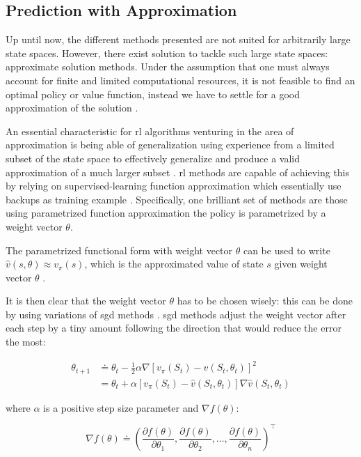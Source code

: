 \documentclass{seal_thesis}
\begin{document}
\subsection{ Prediction with Approximation}
\label{subsec:onpol_pred}

Up until now, the different methods presented are not suited for arbitrarily large state spaces. However, there exist solution to tackle such large state spaces: approximate solution methods. Under the assumption that one must always account for finite and limited computational resources, it is not feasible to find an optimal policy or value function, instead we have to settle for a good approximation of the solution \cite[p. 189]{Sutton2017}.

An essential characteristic for \gls{rl} algorithms venturing in the area of approximation is being able of generalization \ie using experience from a limited subset of the state space to effectively generalize and produce a valid approximation of a much larger subset  \cite[p. 189]{Sutton2017}. \gls{rl} methods are capable of achieving this by relying on supervised-learning function approximation which essentially use backups as training example \cite[p. 222]{Sutton2017}. Specifically, one brilliant set of methods are those using parametrized function approximation \ie the policy is parametrized by a weight vector $\theta$.

The parametrized functional form with weight vector $\theta$ can be used to write $\hat{v}(s,\theta) \approx v_\pi (s)$, which is the approximated value of state $s$ given weight vector $\theta$ \cite[p. 191]{Sutton2017}.

It is then clear that the weight vector $\theta$ has to be chosen wisely: this can be done by using variations of \gls{sgd} methods \cite[p. 223]{Sutton2017}. \gls{sgd} methods adjust the weight vector after each step by a tiny amount following the direction that would reduce the error the most:

\begin{align}
	\theta_{t+1} &\doteq \theta_t - \frac{1}{2} \alpha \nabla [v_\pi (S_t) - \hat{v} (S_t,\theta_t)]^2\\
	&= \theta_t + \alpha  [v_\pi (S_t) - \hat{v} (S_t,\theta_t)] \nabla \hat{v} (S_t,\theta_t)
\end{align}

where $\alpha$ is a positive step size parameter and $\nabla f(\theta)$:

\begin{equation}
	\nabla f(\theta) \doteq \left( \frac{\partial f(\theta)}{\partial \theta_1}, \frac{\partial f(\theta)}{\partial \theta_2}, \ldots, \frac{\partial f(\theta)}{\partial \theta_n} \right)^\top
\end{equation}
\end{document}

